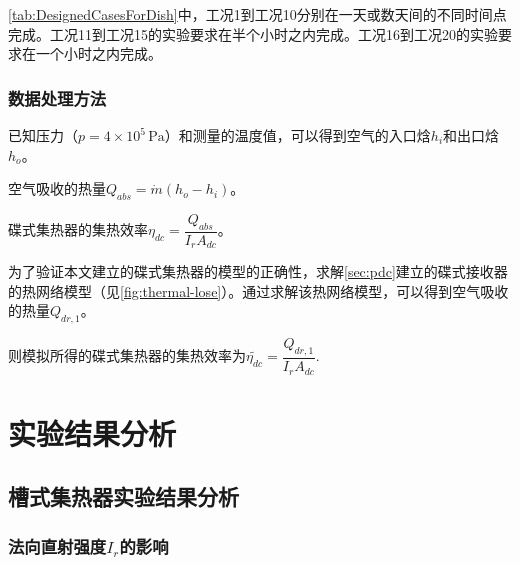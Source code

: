 \autoref{tab:DesignedCasesForDish}中，工况1到工况10分别在一天或数天间的不同时间点完成。工况11到工况15的实验要求在半个小时之内完成。工况16到工况20的实验要求在一个小时之内完成。

\subsubsection{数据处理方法}
已知压力（$p = 4\times10^5\,\mathrm{Pa}$）和测量的温度值，可以得到空气的入口焓$h_i$和出口焓$h_o$。

空气吸收的热量$Q_{abs} = \dot{m}(h_o - h_i)$。

碟式集热器的集热效率$\eta_{dc} = \dfrac{Q_{abs}}{I_r A_{dc}}$。

为了验证本文建立的碟式集热器的模型的正确性，求解\autoref{sec:pdc}建立的碟式接收器的热网络模型（见\autoref{fig:thermal-lose}）。通过求解该热网络模型，可以得到空气吸收的热量$Q_{dr,1}$。

则模拟所得的碟式集热器的集热效率为$\widetilde{\eta_{dc}} = \dfrac{Q_{dr,1}}{I_r A_{dc}}$.

\section{实验结果分析}
\subsection{槽式集热器实验结果分析}

\subsubsection{法向直射强度$I_r$的影响}

